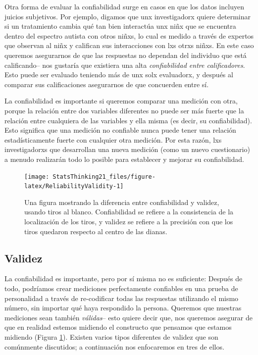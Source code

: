 \documentclass[
  12pt,
]{book}
\begin{document}
Otra forma de evaluar la confiabilidad surge en casos en que los datos incluyen juicios subjetivos. Por ejemplo, digamos que unx investigadorx quiere determinar si un tratamiento cambia qué tan bien interactúa unx niñx que se encuentra dentro del espectro autista con otros niñxs, lo cual es medido a través de expertos que observan al niñx y califican sus interacciones con lxs otrxs niñxs. En este caso queremos asegurarnos de que las respuestas no dependan del individuo que está calificando-- nos gustaría que existiera una alta \emph{confiabilidad entre calificadores}. Esto puede ser evaluado teniendo más de unx solx evaluadorx, y después al comparar sus calificaciones asegurarnos de que concuerden entre sí.

La confiabilidad es importante si queremos comparar una medición con otra, porque la relación entre dos variables diferentes no puede ser más fuerte que la relación entre cualquiera de las variables y ella misma (es decir, su confiabilidad). Esto significa que una medición no confiable nunca puede tener una relación estadísticamente fuerte con cualquier otra medición. Por esta razón, lxs investigadorxs que desarrollan una nueva medición (como un nuevo cuestionario) a menudo realizarán todo lo posible para establecer y mejorar su confiabilidad.

\begin{figure}
\texttt{[image: StatsThinking21\_files/figure-latex/ReliabilityValidity-1]} \caption{Una figura mostrando la diferencia entre confiabilidad y validez, usando tiros al blanco. Confiabilidad se refiere a la consistencia de la localización de los tiros, y validez se refiere a la precisión con que los tiros quedaron respecto al centro de las dianas.}\label{fig:ReliabilityValidity}
\end{figure}

\hypertarget{validez}{%
\subsection{Validez}\label{validez}}

La confiabilidad es importante, pero por sí misma no es suficiente: Después de todo, podríamos crear mediciones perfectamente confiables en una prueba de personalidad a través de re-codificar todas las respuestas utilizando el mismo número, sin importar qué haya respondido la persona. Queremos que nuestras mediciones sean también \emph{válidas}-- esto quiere decir que, nos queremos asegurar de que en realidad estemos midiendo el constructo que pensamos que estamos midiendo (Figura \ref{fig:ReliabilityValidity}). Existen varios tipos diferentes de validez que son comúnmente discutidos; a continuación nos enfocaremos en tres de ellos.
\end{document}
